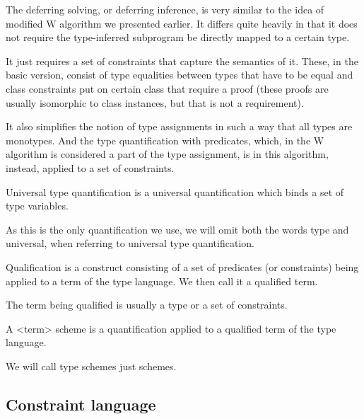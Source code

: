 The deferring solving, or deferring inference, is very similar to the idea of modified W algorithm we presented earlier. It differs quite heavily in that it does not require the type-inferred subprogram be directly mapped to a certain type.

It just requires a set of constraints that capture the semantics of it. These, in the basic version, consist of type equalities between types that have to be equal and class constraints put on certain class that require a proof (these proofs are usually isomorphic to class instances, but that is not a requirement).

It also simplifies the notion of type assignments in such a way that all types are monotypes. And the type quantification with predicates, which, in the W algorithm is considered a part of the type assignment, is in this algorithm, instead, applied to a set of constraints.

\begin{defn}
    Universal type quantification is a universal quantification which binds a set of type variables.

    As this is the only quantification we use, we will omit both the words type and universal, when referring to universal type quantification.

\end{defn}

\begin{defn}[Qualification]
    Qualification is a construct consisting of a set of predicates (or constraints) being applied to a term of the type language. We then call it a qualified term.

    The term being qualified is usually a type or a set of constraints.

\end{defn}

\begin{defn}[Scheme]
    A <term> scheme is a quantification applied to a qualified term of the type language.

    We will call type schemes just schemes.

\end{defn}

\subsection{Constraint language}

